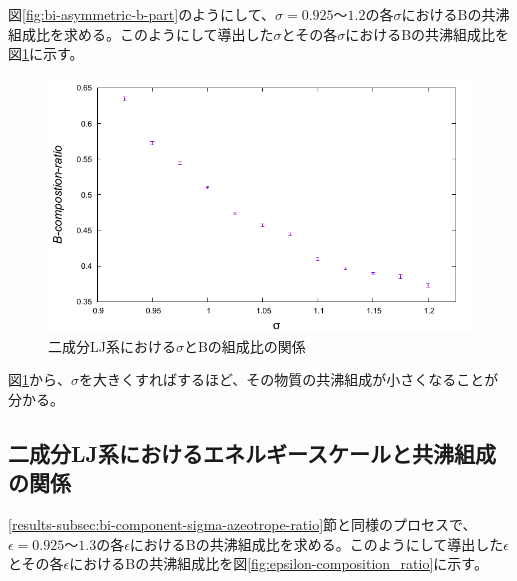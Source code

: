 \documentclass[titlepage]{jsreport}
\begin{document}
\newpage
図\ref{fig:bi-asymmetric-b-part}のようにして、$\sigma=0.925〜1.2$の各$\sigma$におけるBの共沸組成比を求める。このようにして導出した$\sigma$とその各$\sigma$におけるBの共沸組成比を図\ref{fig:sigma-composition_ratio}に示す。

\begin{figure}[htbp]
    \begin{center}
        \includegraphics[width=14cm]{fig/sigma-composition_ratio/sigma-composition_ratio.pdf}
    \end{center}
    \caption{二成分LJ系における$\sigma$とBの組成比の関係}
    \label{fig:sigma-composition_ratio}
\end{figure}

図\ref{fig:sigma-composition_ratio}から、$\sigma$を大きくすればするほど、その物質の共沸組成が小さくなることが分かる。

\newpage
\subsection{二成分LJ系におけるエネルギースケールと共沸組成の関係} \label{results-subsec:bi-component-epsilon-azeotrope-ratio}
\ref{results-subsec:bi-component-sigma-azeotrope-ratio}節と同様のプロセスで、$\epsilon=0.925〜1.3$の各$\epsilon$におけるBの共沸組成比を求める。このようにして導出した$\epsilon$とその各$\epsilon$におけるBの共沸組成比を図\ref{fig:epsilon-composition_ratio}に示す。
\end{document}
